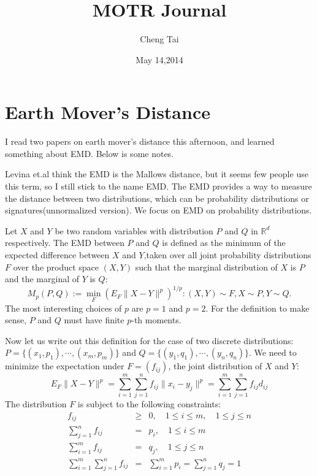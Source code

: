 \documentclass[12pt, reqno]{amsart}
\title{MOTR Journal }
\author{Cheng Tai}
\date{May 14,2014}
\begin{document}
\newtheorem{theorem}{Theorem}
\newtheorem{lemma}{Lemma}
\maketitle
\section*{Earth Mover's Distance}
I read two papers on earth mover's distance this afternoon, \cite{levina2001earth,sheorey2008car} and learned something about EMD. Below is some notes.

Levina et.al think the EMD is the Mallows distance, but it seems few people use this term, so I still stick to the name EMD. The EMD provides a way to measure the distance between two distributions, which can be probability distributions or signatures(unnormalized version). We focus on EMD on probability distributions.

Let $X$ and $Y$ be two random variables with distribution $P$ and $Q$ in $\mathbb{R}^d$ respectively. The EMD between $P$ and $Q$ is defined as the minimum of the expected difference between $X$ and $Y$,taken over all joint probability distributions $F$ over the product space $(X,Y)$ such that the marginal distribution of $X$ is $P$ and the marginal of $Y$ is $Q$:
\begin{equation}
	M_p(P,Q):=\min_{F}\left( E_F\|X-Y\|^p\right)^{1/p}: (X,Y)\sim F, X\sim P, Y\sim Q.
\end{equation}
The most interesting choices of $p$ are $p=1$ and $p=2$. For the definition to make sense, $P$ and $Q$ must have finite $p$-th moments.

Now let us write out this definition for the case of two discrete distributions: $P=\{(x_1,p_1),\cdots,(x_m,p_m)\}$ and $Q=\{(y_1,q_1),\cdots, (y_n,q_n)\}$. We need to minimize the expectation under $F=(f_{ij})$, the joint distribution of $X$ and $Y$:
\begin{equation}
	E_F\|X-Y\|^p=\sum_{i=1}^{m}\sum_{j=1}^{n}f_{ij}\|x_i-y_j\|^p = \sum_{i=1}^{m}\sum_{j=1}^{n}f_{ij}d_{ij}
\end{equation}
The distribution $F$ is subject to the following constraints:
\begin{eqnarray}
	f_{ij} & \geq & 0, \quad 1\leq i\leq m,\quad 1\leq j\leq n\\
	\sum_{j=1}^{n} f_{ij} & = & p_i,\quad 1\leq i\leq m \\
\sum_{i=1}^{m} f_{ij} & = & q_j,\quad 1\leq j\leq n \\
\sum_{i=1}^{m}\sum_{j=1}^{n} f_{ij} &=& \sum_{i=1}^{m} p_i = \sum_{j=1}^{n} q_j = 1
\end{eqnarray}
\end{document}
